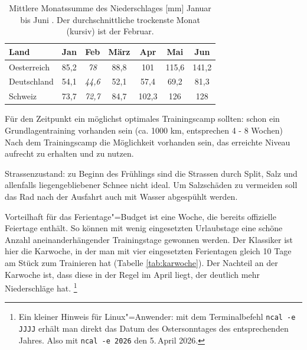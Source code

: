 \documentclass[a4paper,DIV13,BCOR0cm,draft=TRUE]{scrartcl}
\begin{document}
\begin{table}
        \centering
        \begin{tabular}{lcccccc}
                \toprule
                 Land & Jan & Feb & März & Apr & Mai & Jun \\
                 \midrule
                 Oesterreich     & 85,2 & \textit{78} & 88,8 & 101 & 115,6 & 141,2 \\
                 Deutschland    & 54,1 & \textit{44,6} & 52,1 & 57,4 & 69,2 & 81,3 \\
                 Schweiz        & 73,7 & \textit{72,7} & 84,7 & 102,3 & 126 & 128 \\
                 \bottomrule
        \end{tabular}
        \caption{
                Mittlere Monatssumme des Niederschlages [mm] Januar bis Juni \protect\cite{rtl2015klima}.
                Der durchschnittliche trockenste Monat (kursiv) ist der Februar.
            }
        \label{tab:niederschlag}
\end{table}

Für den Zeitpunkt ein möglichst optimales Trainingscamp sollten:
schon ein Grundlagentraining vorhanden sein (ca. 1000 km, entsprechen 4 - 8 Wochen)
Nach dem Trainingscamp die Möglichkeit vorhanden sein, das erreichte Niveau aufrecht zu erhalten und zu nutzen.

Strassenzustand:
zu Beginn des Frühlings sind die Strassen durch Split, Salz und allenfalls liegengebliebener Schnee nicht ideal.
Um Salzschäden zu vermeiden soll das Rad nach der Ausfahrt auch mit Wasser abgespühlt werden.

Vorteilhaft für das Ferientage"=Budget ist eine Woche,
die bereits offizielle Feiertage enthält.
So können mit wenig eingesetzten Urlaubstage eine schöne Anzahl
aneinanderhängender Trainingstage gewonnen werden.
Der Klassiker ist hier die Karwoche,
in der man mit vier eingesetzten Ferientagen gleich 10 Tage am Stück zum Trainieren hat
(Tabelle \ref{tab:karwoche}).
Der Nachteil an der Karwoche ist, dass diese in der Regel im April liegt,
der deutlich mehr Niederschläge hat.
\footnote{Ein kleiner Hinweis für Linux"=Anwender:
mit dem Terminalbefehl \texttt{ncal -e JJJJ} erhält man direkt das
Datum des Ostersonntages des entsprechenden Jahres. Also mit \texttt{ncal -e 2026}
den 5.\,April 2026.}
\end{document}
